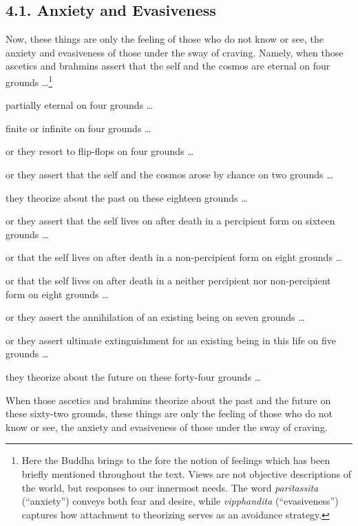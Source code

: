 \documentclass[12pt,openany]{book}%
\begin{document}
\subsection*{4.1. Anxiety and Evasiveness }

Now, these things are only the feeling of those who do not know or see, the anxiety and evasiveness of those under the sway of craving. Namely, when those ascetics and brahmins assert that the self and the cosmos are eternal on four grounds …\footnote{Here the Buddha brings to the fore the notion of feelings which has been briefly mentioned throughout the text. Views are not objective descriptions of the world, but responses to our innermost needs. The word \textit{paritassita} (“anxiety”) conveys both fear and desire, while \textit{vipphandita} (“evasiveness”) captures how attachment to theorizing serves as an avoidance strategy. } 

partially eternal on four grounds … 

finite or infinite on four grounds … 

or they resort to flip-flops on four grounds … 

or they assert that the self and the cosmos arose by chance on two grounds … 

they theorize about the past on these eighteen grounds … 

or they assert that the self lives on after death in a percipient form on sixteen grounds … 

or that the self lives on after death in a non-percipient form on eight grounds … 

or that the self lives on after death in a neither percipient nor non-percipient form on eight grounds … 

or they assert the annihilation of an existing being on seven grounds … 

or they assert ultimate extinguishment for an existing being in this life on five grounds … 

they theorize about the future on these forty-four grounds … 

When those ascetics and brahmins theorize about the past and the future on these sixty-two grounds, these things are only the feeling of those who do not know or see, the anxiety and evasiveness of those under the sway of craving. 
\end{document}
